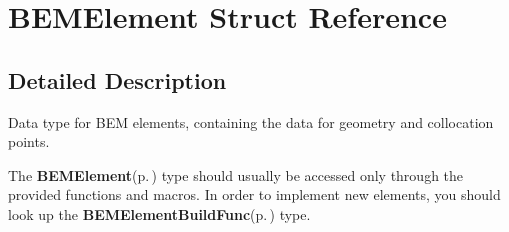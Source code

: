 \section{BEMElement Struct Reference}
\label{structBEMElement}


\subsection{Detailed Description}
Data type for BEM elements, containing the data for geometry and collocation points.

The {\bf BEMElement}{\rm (p.\,\pageref{structBEMElement})} type should usually be accessed only through the provided functions and macros. In order to implement new elements, you should look up the {\bf BEMElement\-Build\-Func}{\rm (p.\,\pageref{structBEMElementBuildFunc})} type. 

